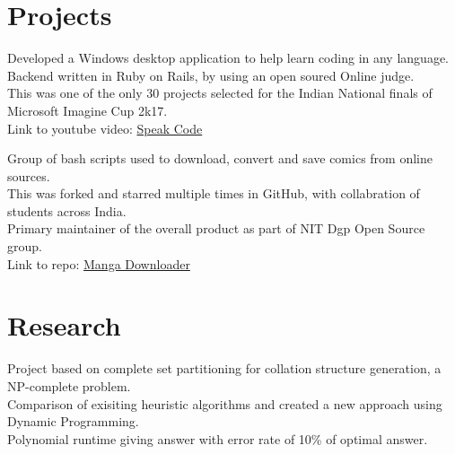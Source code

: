 \documentclass[letterpaper]{deedy-resume} %
\begin{document}
\begin{minipage}[t]{0.66\textwidth}
\section{Projects}


Developed a Windows desktop application to help learn coding in any language. \\
Backend written in Ruby on Rails, by using an open soured Online judge. \\
This was one of the only 30 projects selected for the Indian National finals of Microsoft Imagine Cup 2k17. \\
Link to youtube video: \href{https://www.youtube.com/watch?v=hO4iSh1bSC0}{Speak Code}

\sectionspace


Group of bash scripts used to download, convert and save comics from online sources.\\
This was forked and starred multiple times in GitHub, with collabration of students across India.\\
Primary maintainer of the overall product as part of NIT Dgp Open Source group. \\
Link to repo: \href{https://github.com/NITDgpOS/manga}{Manga Downloader}

\sectionspace





\section{Research}


Project based on complete set partitioning for collation structure generation, a NP-complete problem.\\
Comparison of exisiting heuristic algorithms and created a new approach using Dynamic Programming.\\
Polynomial runtime giving answer with error rate of 10\% of optimal answer.


\end{minipage}
\end{document}
